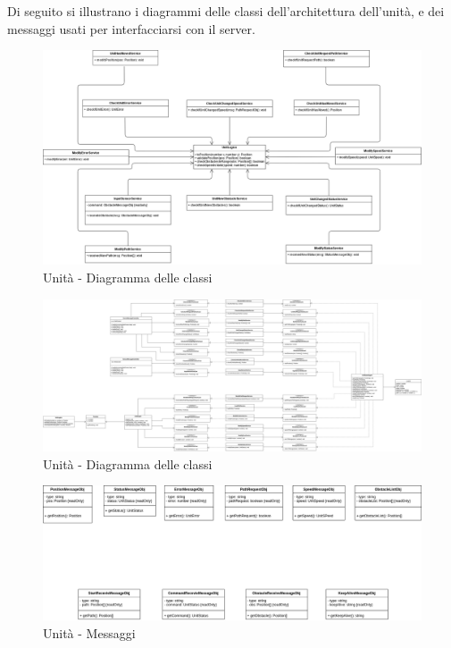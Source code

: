 	Di seguito si illustrano i diagrammi delle classi dell'architettura dell'unità, e dei messaggi usati per interfacciarsi con il server.
	
	\begin{landscape}
		\begin{figure}[h!]
			\includegraphics[width=25.5cm]{img/unit_architettura1.png}
			\caption{Unità - Diagramma delle classi}
		\end{figure}
	\end{landscape}
	
	\begin{landscape}
		\begin{figure}[h!]
			\includegraphics[width=25.5cm]{img/unit_architettura2.png}
			\caption{Unità - Diagramma delle classi}
		\end{figure}
	\end{landscape}
	
	
	\begin{landscape}
		\begin{figure}[H]
			\centering
			\includegraphics[width=25.5cm]{img/unit_messaggi.png}
			\caption{Unità - Messaggi}
		\end{figure}
	\end{landscape}